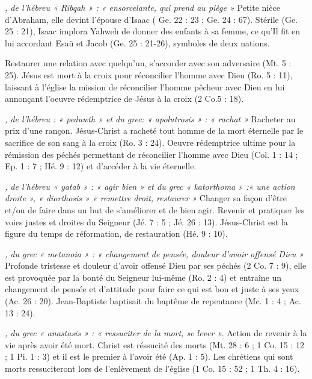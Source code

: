 \begin{multicols}{2}
\textit{, de l'hébreu « Ribqah » : « ensorcelante, qui prend au piège »}\newline
Petite nièce d'Abraham, elle devint l'épouse d'Isaac ( Ge. 22 : 23 ; Ge. 24 : 67). Stérile (Ge. 25 : 21), Isaac implora Yahweh de donner des enfants à sa femme, ce qu'Il fit en lui accordant Esaü et Jacob (Ge. 25 : 21-26), symboles de deux nations.

\textit{}\newline
Restaurer une relation avec quelqu'un, s'accorder avec son adversaire (Mt. 5 : 25). Jésus est mort à la croix pour réconcilier l'homme avec Dieu (Ro. 5 : 11), laissant à l'église la mission de réconcilier l'homme pêcheur avec Dieu en lui annonçant l'oeuvre rédemptrice de Jésus à la croix (2 Co.5 : 18).

\textit{, de l'hébreu : « peduwth » et du grec: « apolutrosis » : « rachat »}\newline
Racheter au prix d'une rançon. Jésus-Christ a racheté tout homme de la mort éternelle par le sacrifice de son sang à la croix (Ro. 3 : 24). Oeuvre rédemptrice ultime pour la rémission des péchés permettant de réconcilier l'homme avec Dieu (Col. 1 : 14 ; Ep. 1 : 7 ; Hé. 9 : 12) et d'accéder à la vie éternelle.

\textit{, de l'hébreu « yatab » : « agir bien » et du grec « katorthoma » :« une action droite », « diorthosis » « remettre droit, restaurer »}\newline
Changer sa façon d'être et/ou de faire dans un but de s'améliorer et de bien agir. Revenir et pratiquer les voies justes et droites du Seigneur (Jé. 7 : 5 ; Jé. 26 : 13). Jésus-Christ est la figure du temps de réformation, de restauration (Hé. 9 : 10).

\textit{, du grec « metanoia » : « changement de pensée, douleur d'avoir offensé Dieu »}\newline
Profonde tristesse et douleur d'avoir offensé Dieu par ses péchés (2 Co. 7 : 9), elle est provoquée par la bonté du Seigneur lui-même (Ro. 2 : 4) et entraîne un changement de pensée et d'attitude pour faire ce qui est bon et juste à ses yeux (Ac. 26 : 20). Jean-Baptiste baptisait du baptême de repentance (Mc. 1 : 4 ; Ac. 13 : 24).

\textit{, du grec « anastasis » : « ressuciter de la mort, se lever ».}\newline
Action de revenir à la vie après avoir été mort. Christ est réssucité des morts (Mt. 28 : 6 ; 1 Co. 15 : 12 ; 1 Pi. 1 : 3) et il est le premier à l'avoir été (Ap. 1 : 5). Les chrétiens qui sont morts ressuciteront lors de l'enlèvement de l'église (1 Co. 15 : 52 ; 1 Th. 4 : 16).


\end{multicols}
